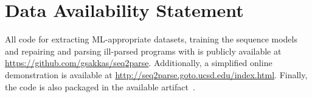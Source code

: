 \section{Data Availability Statement}
\label{sec:data-availability}

All code for extracting ML-appropriate datasets, training the sequence models
and repairing and parsing ill-parsed programs with \toolname is publicly
available at \url{https://github.com/gsakkas/seq2parse}. Additionally, a
simplified online demonstration is available at
\url{http://seq2parse.goto.ucsd.edu/index.html}. Finally, the code is also
packaged in the available artifact~\citep{george_sakkas_2022_7080357}.
